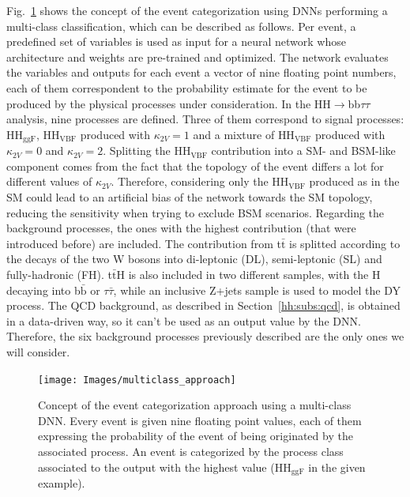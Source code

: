 \documentclass[../main.tex]{subfiles}
\begin{document}
Fig.~\ref{fig:hh:multi_approach} shows the concept of the event categorization using DNNs performing a multi-class classification, which can be described as follows. Per event, a predefined set of variables is used as input for a neural network whose architecture and weights are pre-trained and optimized. The network evaluates the variables and outputs for each event a vector of nine floating point numbers, each of them correspondent to the probability estimate for the event to be produced by the physical processes under consideration. In the HH$\to$bb$\tau\tau$ analysis, nine processes are defined. Three of them correspond to signal processes: $\text{HH}_{\text{ggF}}$, $\text{HH}_{\text{VBF}}$ produced with $\kappa_{2V}=1$ and a mixture of $\text{HH}_{\text{VBF}}$ produced with $\kappa_{2V}=0$ and $\kappa_{2V}=2$. Splitting the $\text{HH}_{\text{VBF}}$ contribution into a SM- and BSM-like component comes from the fact that the topology of the event differs a lot for different values of $\kappa_{2V}$. Therefore, considering only the $\text{HH}_{\text{VBF}}$ produced as in the SM could lead to an artificial bias of the network towards the SM topology, reducing the sensitivity when trying to exclude BSM scenarios. Regarding the background processes, the ones with the highest contribution (that were introduced before) are included. The contribution from t$\bar{\text{t}}$ is splitted according to the decays of the two W bosons into di-leptonic (DL), semi-leptonic (SL) and fully-hadronic (FH). t$\bar{\text{t}}$H is also included in two different samples, with the H decaying into b$\bar{\text{b}}$ or $\tau\bar{\tau}$, while an inclusive Z+jets sample is used to model the DY process. The QCD background, as described in Section~\ref{hh:subs:qcd}, is obtained in a data-driven way, so it can't be used as an output value by the DNN. Therefore, the six background processes previously described are the only ones we will consider.


\begin{figure}[h!]
\texttt{[image: Images/multiclass\_approach]}
\caption{Concept of the event categorization approach using a multi-class DNN. Every event is given nine floating point values, each of them expressing the probability of the event of being originated by the associated process. An event is categorized by the process class associated to the output with the highest value ($\text{HH}_{\text{ggF}}$ in the given example).}
\label{fig:hh:multi_approach}
\end{figure}
\end{document}
